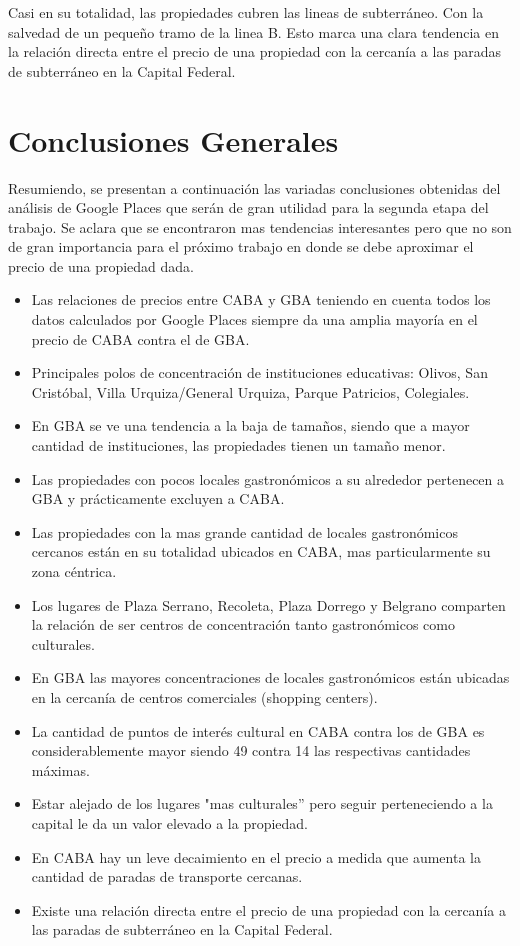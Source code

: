 \documentclass[a4paper, 10pt]{article}
\begin{document}
				Casi en su totalidad, las propiedades cubren las lineas de subterráneo. 
				Con la salvedad de un pequeño tramo de la linea B. Esto marca una clara tendencia en 
				la relación directa entre el precio de una propiedad con la cercanía a las 
				paradas de subterráneo en la Capital Federal.
				
		\section{Conclusiones Generales}
		
			Resumiendo, se presentan a continuación las variadas conclusiones obtenidas del análisis de 
			Google Places que serán de gran utilidad para la segunda etapa del trabajo. Se aclara que se 
			encontraron mas tendencias interesantes pero que no son de gran importancia para el 
			próximo trabajo en donde se debe aproximar el precio de una propiedad dada.			
			
			\begin{itemize}
				\item Las relaciones de precios entre CABA y GBA teniendo en cuenta todos los datos calculados 
				por Google Places siempre da una amplia mayoría en el precio de CABA contra el de GBA.
				\item Principales polos de concentración de instituciones educativas: Olivos, San Cristóbal, 
				Villa Urquiza/General Urquiza, Parque Patricios, Colegiales.
				\item En GBA se ve una tendencia a la baja de tamaños, siendo que a mayor 
				cantidad de instituciones, las propiedades tienen un tamaño menor.
				\item Las propiedades con pocos locales gastronómicos a su alrededor pertenecen a 
				GBA y prácticamente excluyen a CABA.
				\item Las propiedades con la mas grande cantidad de locales gastronómicos 
				cercanos están en su totalidad ubicados en CABA, mas particularmente su zona céntrica.
				\item Los lugares de Plaza Serrano, Recoleta, Plaza Dorrego y Belgrano 
				comparten la relación de ser centros de concentración tanto gastronómicos como culturales.
				\item En GBA las mayores concentraciones de locales gastronómicos están ubicadas 
				en la cercanía de centros comerciales (shopping centers).
				\item La cantidad de puntos de interés cultural en CABA contra los de GBA es 
				considerablemente mayor siendo 49 contra 14 las respectivas cantidades máximas.
				\item Estar alejado de los lugares "mas culturales” pero seguir perteneciendo 
				a la capital le da un valor elevado a la propiedad.
				\item En CABA hay un leve decaimiento en el precio a medida que aumenta la 
				cantidad de paradas de transporte cercanas.
				\item Existe una relación directa entre el precio de una propiedad con 
				la cercanía a las paradas de subterráneo en la Capital Federal.
			\end{itemize}
\end{document}
